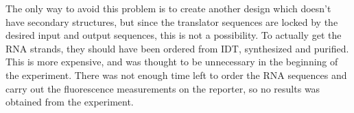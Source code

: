 The only way to avoid this problem is to create another design which doesn't have secondary structures, but since the translator sequences are locked by the desired input and output sequences, this is not a possibility. To actually get the RNA strands, they should have been ordered from IDT, synthesized and purified. This is more expensive, and was thought to be unnecessary in the beginning of the experiment. There was not enough time left to order the RNA sequences and carry out the fluorescence measurements on the reporter, so no results was obtained from the experiment.
